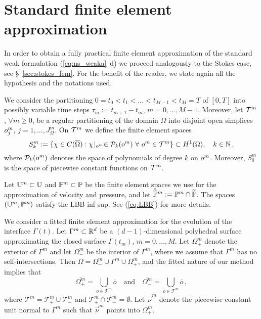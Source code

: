 \section{Standard finite element approximation}\label{sec:ns_fem}
In order to obtain a fully practical finite element approximation of the
standard weak formulation (\ref{eq:ns_weaka}--d) we proceed analogously to the
Stokes case, see \S~\ref{sec:stokes_fem}. For the benefit of the reader, we
state again all the hypothesis and the notations used.

We consider the partitioning  $0= t_0 < t_1 < \ldots < t_{M-1} < t_M = T$ of
$[0,T]$ into possibly variable time steps
$\tau_m := t_{m+1}-t_m$, $m=0 ,\ldots, M-1$. Moreover, let
${\cal T}^m$, $\forall m\ge 0$, be a regular partitioning of the domain
$\Omega$ into disjoint open simplices
$o^m_j$, $j = 1 ,\ldots, J^m_\Omega$. On ${\cal T}^m$ we define the
finite element spaces
\begin{equation*}
S^m_k := \{\chi \in C(\overline{\Omega}) : \chi\!\mid_{o^m}
\in \mathcal{P}_k(o^m) \ \forall\ o^m \in {\cal T}^m\}
\subset H^1(\Omega),\quad k \in \mathbb{N}\,,
\end{equation*}
where $\mathcal{P}_k(o^m)$ denotes the space of polynomials of degree $k$
on $o^m$. Moreover, $S^m_0$ is the space of piecewise constant functions
on ${\cal T}^m$.

Let $\mathbb{U}^m\subset\mathbb{U}$ and $\mathbb{P}^m\subset\mathbb{P}$ be the finite
element spaces we use for the approximation of velocity and pressure,
and let $\widetilde{\mathbb{P}}^m:= \mathbb{P}^m \cap \widetilde{\mathbb{P}}$.
The spaces $(\mathbb{U}^m,\mathbb{P}^m)$ satisfy the LBB inf-sup. See (\ref{eq:LBB})
for more details.

We consider a fitted finite element approximation for the
evolution of the interface $\Gamma(t)$. Let $\Gamma^{m}\subset{\mathbb R}^d$ be a
$(d-1)$-dimensional polyhedral surface approximating the closed surface
$\Gamma(t_m)$, $m=0 ,\ldots, M$. Let $\Omega^m_+$ denote the exterior of
$\Gamma^m$ and let $\Omega^m_-$ be the interior of $\Gamma^m$, where we assume
that $\Gamma^m$ has no self-intersections. Then
$\Omega = \Omega_-^m \cup \Gamma^m \cup \Omega_+^m$, and the fitted nature of
our method implies that
\begin{equation*}
\overline{\Omega^m_+} = \bigcup_{o \in \mathcal{T}^m_+} \overline{o}
\quad\text{and}\quad
\overline{\Omega^m_-} = \bigcup_{o \in \mathcal{T}^m_-} \overline{o} \,,
\end{equation*}
where $\mathcal{T}^m = \mathcal{T}^m_+ \cup \mathcal{T}^m_-$ and
$\mathcal{T}^m_+ \cap \mathcal{T}^m_- = \emptyset$.
Let $\vec{\nu}^m$ denote the piecewise constant unit normal to $\Gamma^m$
such that $\vec\nu^m$ points into $\Omega^m_+$.

